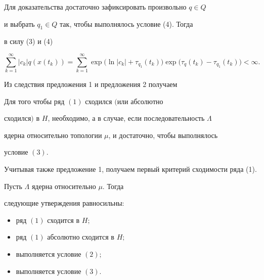 Для доказательства достаточно зафиксировать произвольно $q\in Q$


и выбрать $q_1\in Q$ так, чтобы выполнялось условие (4). Тогда


в силу (3) и (4)


$$


\sum\limits_{k=1}^{\infty}|c_k|q(x(t_k))=


\sum\limits_{k=1}^{\infty}\exp\big(\ln|c_k|+\tau_{q_1}(t_k)\big)


\exp\big(\tau_q(t_k)-\tau_{q_1}(t_k)\big)<\infty.


$$





Из следствия предложения 1 и предложения 2 получаем





\begin{prop}


Для того чтобы ряд $(1)$ сходился $($или абсолютно


сходился$)$ в $H$, необходимо, а в случае, если последовательность $\Lambda$


ядерна относительно топологии $\mu$, и достаточно, чтобы выполнялось


условие $(3)$.


\end{prop}





Учитывая также предложение 1, получаем первый критерий сходимости ряда (1).





\begin{thm}


Пусть $\Lambda$ ядерна относительно $\mu$. Тогда


следующие утверждения равносильны\/$:$


\begin{itemize}


\item[1)] ряд $(1)$ сходится в $H;$


\item[2)] ряд $(1)$ абсолютно сходится в $H;$


\item[3)] выполняется условие $(2);$


\item[4)] выполняется условие $(3)$.


\end{itemize}


\end{thm}





